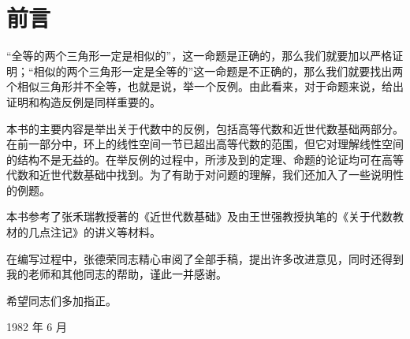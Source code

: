 \chapter*{前言}
“全等的两个三角形一定是相似的”，这一命题是正确的，那么我们就要加以严格证明；“相似的两个三角形一定是全等的”这一命题是不正确的，那么我们就要找出两个相似三角形并不全等，也就是说，举一个反例。由此看来，对于命题来说，给出证明和构造反例是同样重要的。

本书的主要内容是举出关于代数中的反例，包括高等代数和近世代数基础两部分。在前一部分中，环上的线性空间一节已超出高等代数的范围，但它对理解线性空间的结构不是无益的。在举反例的过程中，所涉及到的定理、命题的论证均可在高等代数和近世代数基础中找到。为了有助于对问题的理解，我们还加入了一些说明性的例题。

本书参考了张禾瑞教授著的《近世代数基础》及由王世强教授执笔的《关于代数教材的几点注记》的讲义等材料。

在编写过程中，张德荣同志精心审阅了全部手稿，提出许多改进意见，同时还得到我的老师和其他同志的帮助，谨此一并感谢。

希望同志们多加指正。

\begin{flushright}
1982 年 6 月
\end{flushright}
